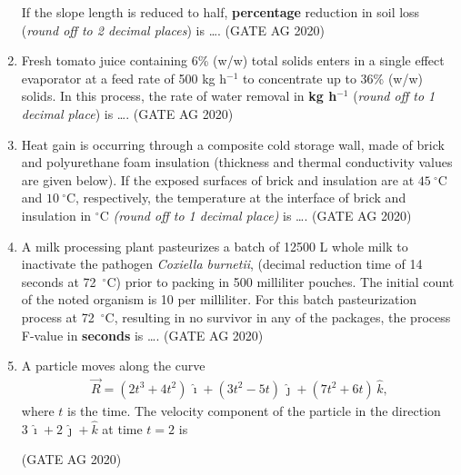\documentclass[journal]{IEEEtran}
\begin{document}
\begin{enumerate}
If the slope length is reduced to half, \textbf{percentage} reduction in soil loss (\textit{round off to 2 decimal places}) is \dots.
\hfill(GATE AG 2020)\\

\medskip

\item 
Fresh tomato juice containing 6\% (w/w) total solids enters in a single effect evaporator at a feed rate of 500 kg h$^{-1}$ to concentrate up to 36\% (w/w) solids. In this process, the rate of water removal in \textbf{kg h$^{-1}$} (\textit{round off to 1 decimal place}) is \dots.
\hfill(GATE AG 2020)\\

\medskip

\item
Heat gain is occurring through a composite cold storage wall, made of brick and polyurethane foam insulation (thickness and thermal conductivity values are given below). If the exposed surfaces of brick and insulation are at $45~^\circ\mathrm{C}$ and $10~^\circ\mathrm{C}$, respectively, the temperature at the interface of brick and insulation in $^\circ\mathrm{C}$ \textit{(round off to 1 decimal place)} is \dots.
\hfill(GATE AG 2020)\\



\medskip

\item 
A milk processing plant pasteurizes a batch of 12500 L whole milk to inactivate the pathogen \textit{Coxiella burnetii}, (decimal reduction time of 14 seconds at 72~$^\circ$C) prior to packing in 500 milliliter pouches. The initial count of the noted organism is 10 per milliliter. For this batch pasteurization process at 72~$^\circ$C, resulting in no survivor in any of the packages, the process F-value in \textbf{seconds} is \dots.
\hfill(GATE AG 2020)\\

\medskip

\item 
A particle moves along the curve 
\begin{align*}
\vec{R} = (2t^3 + 4t^2)\,\hat{\imath} + (3t^2 - 5t)\,\hat{\jmath} + (7t^2 + 6t)\,\hat{k},
\end{align*} 
where $t$ is the time. The velocity component of the particle in the direction $3\,\hat{\imath} + 2\,\hat{\jmath} + \hat{k}$ at time $t = 2$ is

\begin{enumerate}
\end{enumerate}
\hfill(GATE AG 2020)\\


\end{enumerate}
\end{document}
